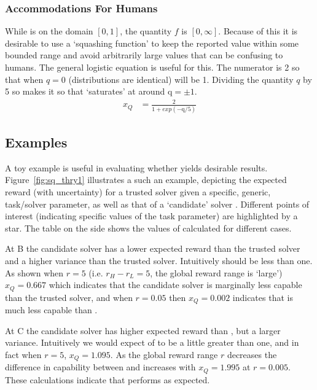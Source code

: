 \subsubsection{Accommodations For Humans}
While \hell{} is on the domain $[0,1]$, the quantity $f$ is $[0,\infty]$. Because of this it is desirable to use a `squashing function' to keep the reported \xQ{} value within some bounded range and avoid arbitrarily large values that can be confusing to humans. The general logistic equation is useful for this.
The numerator is 2 so that when $q=0$ (distributions are identical) \xQ{} will be 1. Dividing the quantity $q$ by 5 so makes it so that \xQ{} `saturates' at around $\text{q}=\pm1$.
\begin{align}
    x_{Q} &= \frac{2}{1+exp(-\text{q}/5)}\label{eq:SQ}
\end{align}

\subsection{Examples}
A toy example is useful in evaluating whether \xQ{} yields desirable results. Figure~\ref{fig:sq_thry1} illustrates a such an example, depicting the expected reward (with uncertainty) for a trusted solver \solvestar{} given a specific, generic, task/solver parameter, as well as that of a `candidate' solver \solve. Different points of interest (indicating specific values of the task parameter) are highlighted by a star. The table on the side shows the values of \xQ{} calculated for different cases.

At B the candidate solver has a lower expected reward than the trusted solver and a higher variance than the trusted solver. Intuitively \xQ{} should be less than one. As shown when $r=5$ (i.e. $r_H-r_L=5$, the global reward range is `large') $x_Q=0.667$ which indicates that the candidate solver is marginally less capable than the trusted solver, and when $r=0.05$ then $x_Q=0.002$ indicates that \solve{} is much less capable than \solvestar.

At C the candidate solver \solve{} has higher expected reward than \solvestar, but a larger variance. Intuitively we would expect \xQ{} of \solve{} to be a little greater than one, and in fact when $r=5$, $x_Q=1.095$. As the global reward range $r$ decreases the difference in capability between \solve{} and \solvestar{} increases with $x_Q=1.995$ at $r=0.005$. These calculations indicate that \xQ{} performs as expected.


